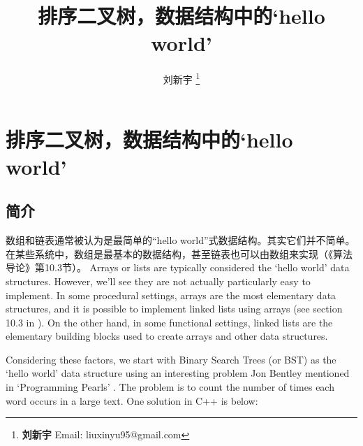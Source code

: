\documentclass[UTF8]{article}
\begin{document}


\title{排序二叉树，数据结构中的`hello world'}

\author{刘新宇
\thanks{{\bfseries 刘新宇} \newline
  Email: liuxinyu95@gmail.com \newline}
  }

\maketitle
\fi


\ifx\wholebook\relax
\chapter{排序二叉树，数据结构中的`hello world'}
\fi

\section{简介}
\label{introduction} 

数组和链表通常被认为是最简单的“hello world”式数据结构。其实它们并不简单。在某些系统中，数组是最基本的数据结构，甚至链表也可以由数组来实现（《算法导论》第10.3节\cite{CLRS}）。
Arrays or lists are typically considered the `hello world' data structures.
However, we'll see they are not actually particularly easy to implement. In some procedural
settings, arrays are the most elementary data structures, and it is possible to implement
linked lists using arrays (see section 10.3 in \cite{CLRS}). On the other hand, in some functional settings,
linked lists are the elementary building blocks used to create arrays and other data structures.

Considering these factors, we start with Binary Search Trees (or BST) as the `hello world'
data structure using an interesting problem Jon Bentley mentioned in `Programming Pearls'
\cite{Bentley}. The problem is to count the number of times each word occurs
in a large text. One solution in C++ is below:
\end{document}
